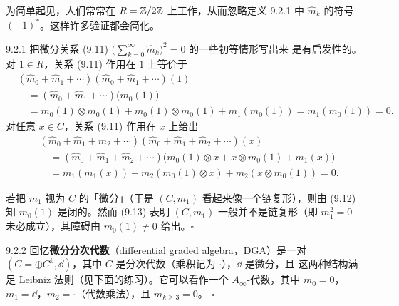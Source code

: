 为简单起见，人们常常在 $R=\mathbb{Z}/2\mathbb{Z}$ 上工作，从而忽略定义 9.2.1 中 $\hat m_k$ 的符号
$(-1)^*$。这样许多验证都会简化。

\begin{wexam}{9.2.1}
  把微分关系 (9.11) $\bigl(\sum_{k=0}^\infty\hat m_k\bigr)^2=0$ 的一些初等情形写出来
  是有启发性的。
  对 $1\in R$，关系 (9.11) 作用在 $1$ 上等价于
  \begin{equation}\tag{9.12}
  \begin{aligned}
    &(\hat m_0+\hat m_1+\cdots)(\hat m_0+\hat m_1+\cdots)(1)\\
    &\quad=(\hat m_0+\hat m_1+\cdots)\bigl(m_0(1)\bigr)\\
    &\quad=m_0(1)\otimes m_0(1)+m_0(1)\otimes m_0(1)+m_1(m_0(1))
      =m_1(m_0(1))=0.
  \end{aligned}
  \end{equation}
  对任意 $x\in C$，关系 (9.11) 作用在 $x$ 上给出
  \begin{equation}\tag{9.13}
  \begin{aligned}
    &(\hat m_0+\hat m_1+\hat m_2+\cdots)
      (\hat m_0+\hat m_1+\hat m_2+\cdots)(x)\\
    &\quad=(\hat m_0+\hat m_1+\hat m_2+\cdots)
      \bigl(m_0(1)\otimes x+x\otimes m_0(1)+m_1(x)\bigr)\\
    &\quad=m_1(m_1(x))+m_2(m_0(1)\otimes x)+m_2(x\otimes m_0(1))=0.
  \end{aligned}
  \end{equation}

  若把 $m_1$ 视为 $C$ 的「微分」（于是 $(C,m_1)$ 看起来像一个链复形），则由 (9.12)
  知 $m_0(1)$ 是闭的。然而 (9.13) 表明 $(C,m_1)$ 一般并不是链复形（即 $m_1^2=0$
  未必成立），其障碍由 $m_0(1)\neq0$ 给出。\hfill$\square$
\end{wexam}

\begin{wexam}{9.2.2}
  回忆\textbf{微分分次代数}（differential graded algebra，DGA）是一对
  $(C=\oplus C^k,\dd)$，其中 $C$ 是分次代数（乘积记为 $\cdot$），$\dd$ 是微分，且
  这两种结构满足 Leibniz 法则（见下面的练习）。它可以看作一个 $A_\infty$-代数，其中
  $m_0=0$，$m_1=\dd$，$m_2=\cdot$（代数乘法），且 $m_{k\geqslant3}=0$。
  \hfill$\square$
\end{wexam}

